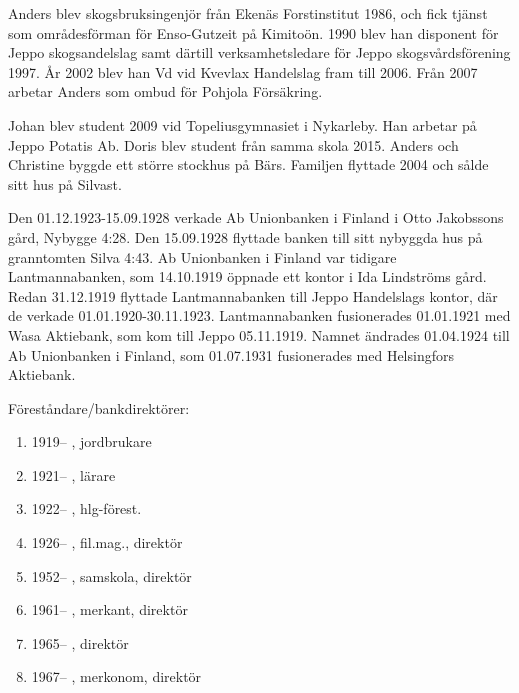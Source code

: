 Anders blev skogsbruksingenjör från Ekenäs Forstinstitut 1986, och fick tjänst som områdesförman för Enso-Gutzeit på Kimitoön. 1990 blev han disponent för Jeppo skogsandelslag samt därtill verksamhetsledare för Jeppo skogsvårdsförening 1997. År 2002 blev han Vd vid Kvevlax Handelslag fram till 2006. Från 2007 arbetar Anders som ombud för Pohjola Försäkring.
\begin{jhchildren}
  \item {}
  \item {}
\end{jhchildren}
Johan blev student 2009 vid Topeliusgymnasiet i Nykarleby. Han arbetar på Jeppo Potatis Ab. Doris blev student från samma skola 2015. Anders och Christine byggde ett större stockhus på Bärs. Familjen flyttade 2004 och sålde sitt hus på Silvast.


Den 01.12.1923-15.09.1928 verkade Ab Unionbanken i Finland i Otto Jakobssons gård, Nybygge 4:28. Den 15.09.1928 flyttade banken till sitt nybyggda hus på granntomten Silva 4:43. Ab Unionbanken i Finland var tidigare Lantmannabanken, som 14.10.1919 öppnade ett kontor i Ida Lindströms gård. Redan 31.12.1919 flyttade Lantmannabanken till Jeppo Handelslags kontor, där de verkade 01.01.1920-30.11.1923. Lantmannabanken fusionerades 01.01.1921 med Wasa Aktiebank, som kom till Jeppo 05.11.1919. Namnet ändrades 01.04.1924 till Ab Unionbanken i Finland, som 01.07.1931 fusionerades med Helsingfors Aktiebank.

Föreståndare/bankdirektörer:
\begin{enumerate}
  \item 1919--	,	jordbrukare
  \item 1921--	, lärare
  \item 1922--	, hlg-förest.
  \item 1926--	, fil.mag., direktör
  \item 1952--	, samskola, direktör
  \item 1961--	, merkant, direktör
  \item 1965--	, direktör
  \item 1967--	,	merkonom, direktör
\end{enumerate}

